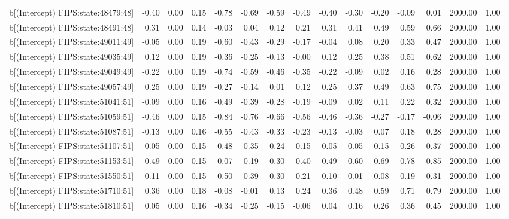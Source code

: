 \begin{table}[ht]
\begin{tabular}{rrrrrrrrrrrrrrr}
  b[(Intercept) FIPS:state:48479:48] & -0.40 & 0.00 & 0.15 & -0.78 & -0.69 & -0.59 & -0.49 & -0.40 & -0.30 & -0.20 & -0.09 & 0.01 & 2000.00 & 1.00 \\ 
  b[(Intercept) FIPS:state:48491:48] & 0.31 & 0.00 & 0.14 & -0.03 & 0.04 & 0.12 & 0.21 & 0.31 & 0.41 & 0.49 & 0.59 & 0.66 & 2000.00 & 1.00 \\ 
  b[(Intercept) FIPS:state:49011:49] & -0.05 & 0.00 & 0.19 & -0.60 & -0.43 & -0.29 & -0.17 & -0.04 & 0.08 & 0.20 & 0.33 & 0.47 & 2000.00 & 1.00 \\ 
  b[(Intercept) FIPS:state:49035:49] & 0.12 & 0.00 & 0.19 & -0.36 & -0.25 & -0.13 & -0.00 & 0.12 & 0.25 & 0.38 & 0.51 & 0.62 & 2000.00 & 1.00 \\ 
  b[(Intercept) FIPS:state:49049:49] & -0.22 & 0.00 & 0.19 & -0.74 & -0.59 & -0.46 & -0.35 & -0.22 & -0.09 & 0.02 & 0.16 & 0.28 & 2000.00 & 1.00 \\ 
  b[(Intercept) FIPS:state:49057:49] & 0.25 & 0.00 & 0.19 & -0.27 & -0.14 & 0.01 & 0.12 & 0.25 & 0.37 & 0.49 & 0.63 & 0.75 & 2000.00 & 1.00 \\ 
  b[(Intercept) FIPS:state:51041:51] & -0.09 & 0.00 & 0.16 & -0.49 & -0.39 & -0.28 & -0.19 & -0.09 & 0.02 & 0.11 & 0.22 & 0.32 & 2000.00 & 1.00 \\ 
  b[(Intercept) FIPS:state:51059:51] & -0.46 & 0.00 & 0.15 & -0.84 & -0.76 & -0.66 & -0.56 & -0.46 & -0.36 & -0.27 & -0.17 & -0.06 & 2000.00 & 1.00 \\ 
  b[(Intercept) FIPS:state:51087:51] & -0.13 & 0.00 & 0.16 & -0.55 & -0.43 & -0.33 & -0.23 & -0.13 & -0.03 & 0.07 & 0.18 & 0.28 & 2000.00 & 1.00 \\ 
  b[(Intercept) FIPS:state:51107:51] & -0.05 & 0.00 & 0.15 & -0.48 & -0.35 & -0.24 & -0.15 & -0.05 & 0.05 & 0.15 & 0.26 & 0.37 & 2000.00 & 1.00 \\ 
  b[(Intercept) FIPS:state:51153:51] & 0.49 & 0.00 & 0.15 & 0.07 & 0.19 & 0.30 & 0.40 & 0.49 & 0.60 & 0.69 & 0.78 & 0.85 & 2000.00 & 1.00 \\ 
  b[(Intercept) FIPS:state:51550:51] & -0.11 & 0.00 & 0.15 & -0.50 & -0.39 & -0.30 & -0.21 & -0.10 & -0.01 & 0.08 & 0.19 & 0.31 & 2000.00 & 1.00 \\ 
  b[(Intercept) FIPS:state:51710:51] & 0.36 & 0.00 & 0.18 & -0.08 & -0.01 & 0.13 & 0.24 & 0.36 & 0.48 & 0.59 & 0.71 & 0.79 & 2000.00 & 1.00 \\ 
  b[(Intercept) FIPS:state:51810:51] & 0.05 & 0.00 & 0.16 & -0.34 & -0.25 & -0.15 & -0.06 & 0.04 & 0.16 & 0.26 & 0.36 & 0.45 & 2000.00 & 1.00 \\ 

\end{tabular}
\end{table}
